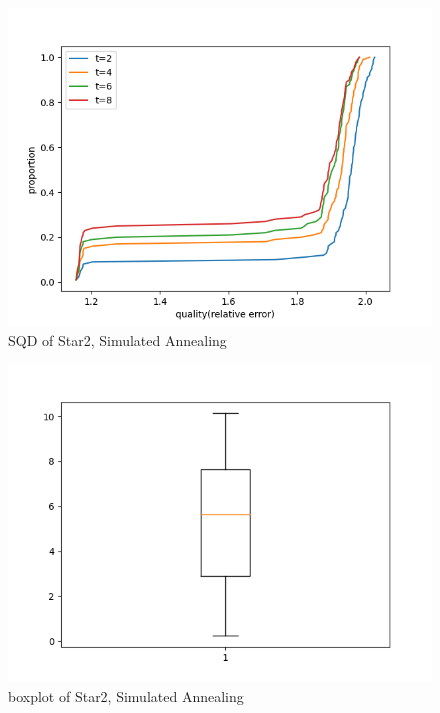 \documentclass[acmlarge]{acmart}
\begin{document}
\begin{figure}[h]
	\includegraphics[width=\linewidth]{star2_SQD_LS1.png}
	\caption{SQD of Star2, Simulated Annealing}
\end{figure}

\begin{figure}[h]
	\includegraphics[width=\linewidth]{star2_boxplot_LS1.png}
	\caption{boxplot of Star2, Simulated Annealing}
\end{figure}

\end{document}
